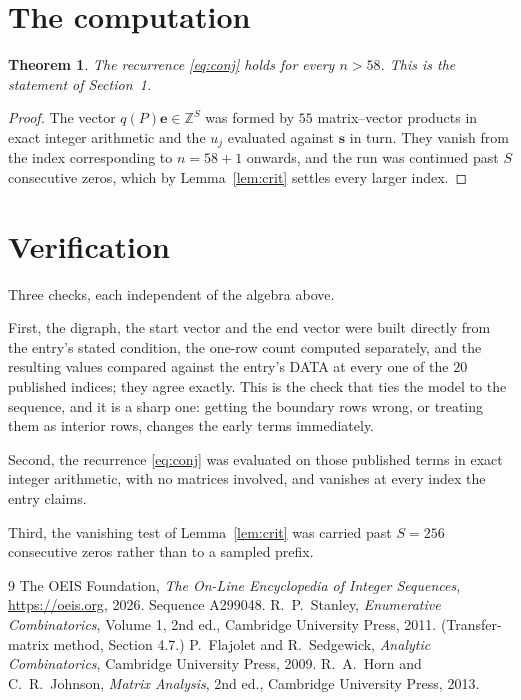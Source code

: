 \documentclass[11pt,a4paper]{article}
\theoremstyle{plain}
\newtheorem{theorem}{Theorem}
\theoremstyle{definition}
\begin{document}
\section{The computation}

\begin{theorem}
The recurrence \eqref{eq:conj} holds for every $n>58$. This is the statement of
Section~1.
\end{theorem}

\begin{proof}
The vector $q(P)\mathbf{e}\in\mathbb{Z}^{S}$ was formed by $55$ matrix--vector
products in exact integer arithmetic and the $u_j$ evaluated against $\mathbf{s}$ in turn.
They vanish from the index corresponding to $n=58+1$ onwards, and the run was continued
past $S$ consecutive zeros, which by Lemma~\ref{lem:crit} settles every larger index.
\end{proof}

\section{Verification}

Three checks, each independent of the algebra above.

First, the digraph, the start vector and the end vector were built directly from the
entry's stated condition, the one-row count computed separately, and the resulting values
compared against the entry's DATA at every one of the $20$ published indices; they
agree exactly. This is the check that ties the model to the sequence, and it is a sharp one:
getting the boundary rows wrong, or treating them as interior rows, changes the early terms
immediately.

Second, the recurrence \eqref{eq:conj} was evaluated on those published terms in exact
integer arithmetic, with no matrices involved, and vanishes at every index the entry claims.

Third, the vanishing test of Lemma~\ref{lem:crit} was carried past $S=256$ consecutive
zeros rather than to a sampled prefix.

\begin{thebibliography}{9}
 The OEIS Foundation, \emph{The On-Line Encyclopedia of Integer
Sequences}, \url{https://oeis.org}, 2026. Sequence A299048.
 R.~P.~Stanley, \emph{Enumerative Combinatorics}, Volume 1, 2nd ed.,
Cambridge University Press, 2011. (Transfer-matrix method, Section 4.7.)
 P.~Flajolet and R.~Sedgewick, \emph{Analytic Combinatorics}, Cambridge
University Press, 2009.
 R.~A.~Horn and C.~R.~Johnson, \emph{Matrix Analysis}, 2nd ed., Cambridge
University Press, 2013.
\end{thebibliography}
\end{document}
